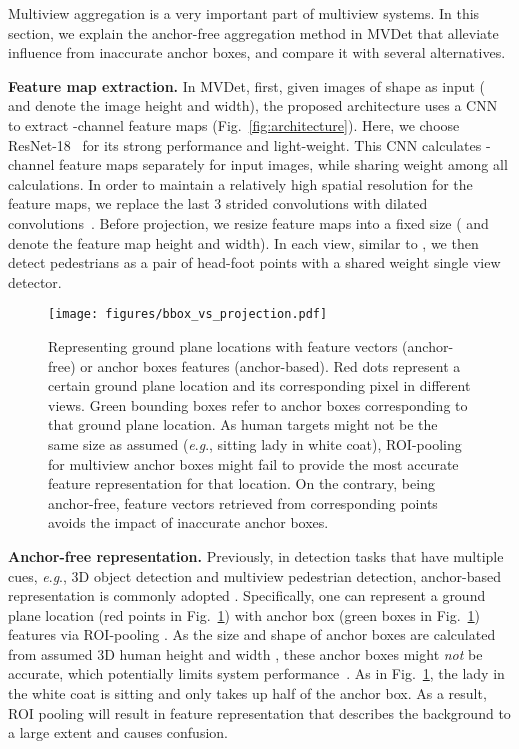 \documentclass[runningheads]{llncs}
\newcommand{\eg}{\textit{e}.\textit{g}.}
\begin{document}
Multiview aggregation is a very important part of multiview systems. In this section, we explain the anchor-free aggregation method in MVDet that alleviate influence from inaccurate anchor boxes, and compare it with several alternatives. 

\textbf{Feature map extraction. }
In MVDet, first, given  images of shape  as input ( and  denote the image height and width), the proposed architecture uses a CNN to extract  -channel feature maps (Fig.~\ref{fig:architecture}). Here, we choose ResNet-18~\cite{he2016deep} for its strong performance and light-weight. This CNN calculates -channel feature maps separately for  input images, while sharing weight among all calculations. In order to maintain a relatively high spatial resolution for the feature maps, we replace the last 3 strided convolutions with dilated convolutions~\cite{yu2015multi}. 
Before projection, we resize  feature maps into a fixed size  ( and  denote the feature map height and width). 
In each view, similar to \cite{law2018cornernet,song2018small}, we then detect pedestrians as a pair of head-foot points with a shared weight single view detector. 



\begin{figure}[t]
    \centering
    \texttt{[image: figures/bbox\_vs\_projection.pdf]}
    \caption{Representing ground plane locations with feature vectors (anchor-free) or anchor boxes features (anchor-based). Red dots represent a certain ground plane location and its corresponding pixel in different views. Green bounding boxes refer to anchor boxes corresponding to that ground plane location. As human targets might not be the same size as assumed (\eg, sitting lady in white coat), ROI-pooling for multiview anchor boxes might fail to provide the most accurate feature representation for that location. On the contrary, being anchor-free, feature vectors retrieved from corresponding points avoids the impact of inaccurate anchor boxes. 
    }
    \label{fig:bbox_vs_projection}
\end{figure}


\textbf{Anchor-free representation.} 
Previously, in detection tasks that have multiple cues, \eg, 3D object detection and multiview pedestrian detection, anchor-based representation is commonly adopted \cite{chen2017multi,ku2018joint,chavdarova2017deep,baque2017deep}. 
Specifically, one can represent a ground plane location (red points in Fig.~\ref{fig:bbox_vs_projection}) with anchor box (green boxes in Fig.~\ref{fig:bbox_vs_projection}) features via ROI-pooling \cite{girshick2015fast}. As the size and shape of anchor boxes are calculated from assumed 3D human height and width \cite{chavdarova2017deep,baque2017deep}, 
these anchor boxes might \textit{not} be accurate, which potentially limits system performance~\cite{zhu2019feature,kong2019foveabox,yang2018metaanchor}. As in Fig.~\ref{fig:bbox_vs_projection}, the lady in the white coat is sitting and only takes up half of the anchor box. As a result, ROI pooling will result in feature representation that describes the background to a large extent and causes confusion. 
\end{document}
